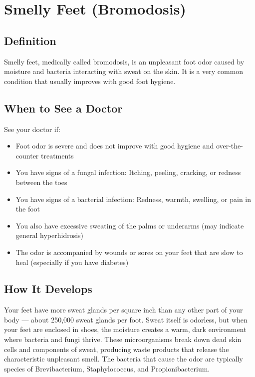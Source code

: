 \chapter{Smelly Feet (Bromodosis)}

\section*{Definition}
Smelly feet, medically called bromodosis, is an unpleasant foot odor caused by moisture and bacteria interacting with sweat on the skin. It is a very common condition that usually improves with good foot hygiene.

\section*{When to See a Doctor}
See your doctor if:
\begin{itemize}
  \item Foot odor is severe and does not improve with good hygiene and over-the-counter treatments
  \item You have signs of a fungal infection: Itching, peeling, cracking, or redness between the toes
  \item You have signs of a bacterial infection: Redness, warmth, swelling, or pain in the foot
  \item You also have excessive sweating of the palms or underarms (may indicate general hyperhidrosis)
  \item The odor is accompanied by wounds or sores on your feet that are slow to heal (especially if you have diabetes)
\end{itemize}

\section*{How It Develops}
Your feet have more sweat glands per square inch than any other part of your body — about 250,000 sweat glands per foot. Sweat itself is odorless, but when your feet are enclosed in shoes, the moisture creates a warm, dark environment where bacteria and fungi thrive. These microorganisms break down dead skin cells and components of sweat, producing waste products that release the characteristic unpleasant smell. The bacteria that cause the odor are typically species of Brevibacterium, Staphylococcus, and Propionibacterium.

